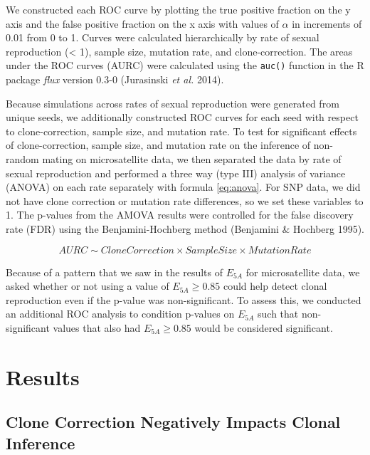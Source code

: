 \documentclass[]{article}
\theoremstyle{definition}
\theoremstyle{definition}
\theoremstyle{definition}
\theoremstyle{remark}
\begin{document}
We constructed each ROC curve by plotting the true positive fraction on
the y axis and the false positive fraction on the x axis with values of
\(\alpha\) in increments of 0.01 from 0 to 1. Curves were calculated
hierarchically by rate of sexual reproduction (\textless{} 1), sample
size, mutation rate, and clone-correction. The areas under the ROC
curves (AURC) were calculated using the \texttt{auc()} function in the R
package \emph{flux} version 0.3-0 (Jurasinski \emph{et al.} 2014).

Because simulations across rates of sexual reproduction were generated
from unique seeds, we additionally constructed ROC curves for each seed
with respect to clone-correction, sample size, and mutation rate. To
test for significant effects of clone-correction, sample size, and
mutation rate on the inference of non-random mating on microsatellite
data, we then separated the data by rate of sexual reproduction and
performed a three way (type III) analysis of variance (ANOVA) on each
rate separately with formula \eqref{eq:anova}. For SNP data, we did not
have clone correction or mutation rate differences, so we set these
variables to 1. The p-values from the AMOVA results were controlled for
the false discovery rate (FDR) using the Benjamini-Hochberg method
(Benjamini \& Hochberg 1995).

\begin{equation}
AURC \sim Clone Correction \times Sample Size \times Mutation Rate \label{eq:anova}
\end{equation}

Because of a pattern that we saw in the results of \(E_{5A}\) for
microsatellite data, we asked whether or not using a value of
\(E_{5A} \geq 0.85\) could help detect clonal reproduction even if the
p-value was non-significant. To assess this, we conducted an additional
ROC analysis to condition p-values on \(E_{5A}\) such that
non-significant values that also had \(E_{5A} \geq 0.85\) would be
considered significant.

\section{Results}\label{results}

\subsection{Clone Correction Negatively Impacts Clonal
Inference}\label{clone-correction-negatively-impacts-clonal-inference}
\end{document}
